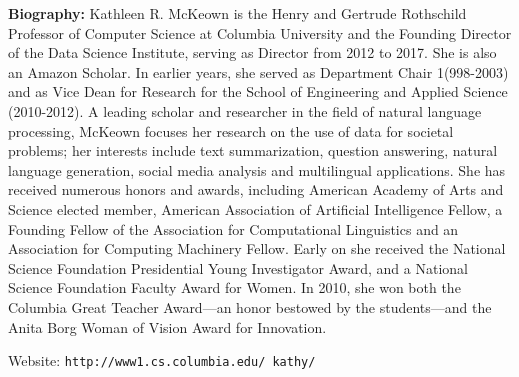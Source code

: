 {\bf Biography:} Kathleen R. McKeown is the Henry and Gertrude Rothschild Professor of Computer Science at Columbia University and the Founding Director of the Data Science Institute, serving as Director from 2012 to 2017. She is also an Amazon Scholar. In earlier years, she served as Department Chair 1(998-2003) and as Vice Dean for Research for the School of Engineering and Applied Science (2010-2012). A leading scholar and researcher in the field of natural language processing, McKeown focuses her research on the use of data for societal problems; her interests include text summarization, question answering, natural language generation, social media analysis and multilingual applications. She has received numerous honors and awards, including American Academy of Arts and Science elected member, American Association of Artificial Intelligence Fellow, a Founding Fellow of the Association for Computational Linguistics and an Association for Computing Machinery Fellow. Early on she received the National Science Foundation Presidential Young Investigator Award, and a National Science Foundation Faculty Award for Women. In 2010, she won both the Columbia Great Teacher Award—an honor bestowed by the students—and the Anita Borg Woman of Vision Award for Innovation.

Website: {\tt http://www1.cs.columbia.edu/~kathy/}

\newpage
